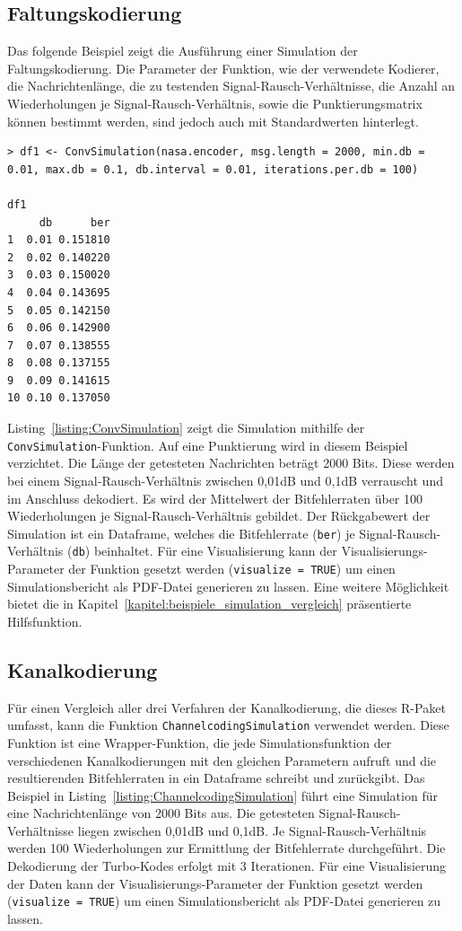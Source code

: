 \subsection{Faltungskodierung}
\label{kapitel:beispiele_simulation_faltungskodierung}
Das folgende Beispiel zeigt die Ausführung einer Simulation der Faltungskodierung. Die Parameter der Funktion, wie der verwendete Kodierer, die Nachrichtenlänge, die zu testenden Signal-Rausch-Verhältnisse, die Anzahl an Wiederholungen je Signal-Rausch-Verhältnis, sowie die Punktierungsmatrix können bestimmt werden, sind jedoch auch mit Standardwerten hinterlegt.

\begin{lstlisting}[caption=Simulation der Faltungskodierung, label={listing:ConvSimulation}, float=!th]
> df1 <- ConvSimulation(nasa.encoder, msg.length = 2000, min.db = 0.01, max.db = 0.1, db.interval = 0.01, iterations.per.db = 100)

df1
     db      ber
1  0.01 0.151810
2  0.02 0.140220
3  0.03 0.150020
4  0.04 0.143695
5  0.05 0.142150
6  0.06 0.142900
7  0.07 0.138555
8  0.08 0.137155
9  0.09 0.141615
10 0.10 0.137050
\end{lstlisting}

Listing~\ref{listing:ConvSimulation} zeigt die Simulation mithilfe der \texttt{ConvSimulation}-Funktion. Auf eine Punktierung wird in diesem Beispiel verzichtet. Die Länge der getesteten Nachrichten beträgt 2000 Bits. Diese werden bei einem Signal-Rausch-Verhältnis zwischen 0,01dB und 0,1dB verrauscht und im Anschluss dekodiert. Es wird der Mittelwert der Bitfehlerraten über 100 Wiederholungen je Signal-Rausch-Verhältnis gebildet. Der Rückgabewert der Simulation ist ein Dataframe, welches die Bitfehlerrate (\texttt{ber}) je Signal-Rausch-Verhältnis (\texttt{db}) beinhaltet. Für eine Visualisierung kann der Visualisierungs-Parameter der Funktion gesetzt werden (\texttt{visualize = TRUE}) um einen Simulationsbericht als PDF-Datei generieren zu lassen. Eine weitere Möglichkeit bietet die in Kapitel~\ref{kapitel:beispiele_simulation_vergleich} präsentierte Hilfsfunktion.

\subsection{Kanalkodierung}
\label{kapitel:beispiele_simulation_kanalkodierung}
Für einen Vergleich aller drei Verfahren der Kanalkodierung, die dieses R-Paket umfasst, kann die Funktion \texttt{ChannelcodingSimulation} verwendet werden. Diese Funktion ist eine Wrapper-Funktion, die jede Simulationsfunktion der verschiedenen Kanalkodierungen mit den gleichen Parametern aufruft und die resultierenden Bitfehlerraten in ein Dataframe schreibt und zurückgibt. Das Beispiel in Listing~\ref{listing:ChannelcodingSimulation} führt eine Simulation für eine Nachrichtenlänge von 2000 Bits aus. Die getesteten Signal-Rausch-Verhältnisse liegen zwischen 0,01dB und 0,1dB. Je Signal-Rausch-Verhältnis werden 100 Wiederholungen zur Ermittlung der Bitfehlerrate durchgeführt. Die Dekodierung der Turbo-Kodes erfolgt mit 3 Iterationen. Für eine Visualisierung der Daten kann der Visualisierungs-Parameter der Funktion gesetzt werden (\texttt{visualize = TRUE}) um einen Simulationsbericht als PDF-Datei generieren zu lassen.

